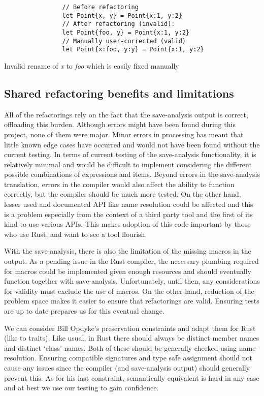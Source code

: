 \begin{fig}
\begin{verbatim}
                // Before refactoring
                let Point{x, y} = Point{x:1, y:2}
                // After refactoring (invalid):
                let Point{foo, y} = Point{x:1, y:2}
                // Manually user-corrected (valid)
                let Point{x:foo, y:y} = Point{x:1, y:2}
\end{verbatim}
\caption{Invalid rename of \emph{x} to \emph{foo} which is easily fixed manually}
\label{Fig:fix}
\end{fig}

\subsection{Shared refactoring benefits and limitations}
All of the refactorings rely on the fact that the save-analysis output is correct, offloading this burden. Although errors might have been found during this project, none of them were major. Minor errors in processing has meant that little known edge cases have occurred and would not have been found without the current testing. In terms of current testing of the save-analysis functionality, it is relatively minimal and would be difficult to implement considering the different possible combinations of expressions and items. Beyond errors in the save-analysis translation, errors in the compiler would also affect the ability to function correctly, but the compiler should be much more tested. On the other hand, lesser used and documented API like name resolution could be affected and this is a problem especially from the context of a third party tool and the first of its kind to use various APIs. This makes adoption of this code important by those who use Rust, and want to see a tool flourish.

With the save-analysis, there is also the limitation of the missing macros in the output. As a pending issue in the Rust compiler, the necessary plumbing required for macros could be implemented given enough resources and should eventually function together with save-analysis. Unfortunately, until then, any considerations for validity must exclude the use of macros. On the other hand, reduction of the problem space makes it easier to ensure that refactorings are valid. Ensuring tests are up to date prepares us for this eventual change.

We can consider Bill Opdyke's preservation constraints and adapt them for Rust (like to traits). Like usual, in Rust there should always be distinct member names and distinct `class' names. Both of these should be generally checked using name-resolution. Ensuring compatible signatures and type safe assignment should not cause any issues since the compiler (and save-analysis output) should generally prevent this. As for his last constraint, semantically equivalent is hard in any case and at best we use our testing to gain confidence.

